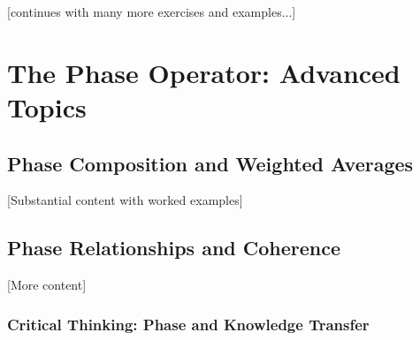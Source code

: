 [continues with many more exercises and examples...]

\chapter{The Phase Operator: Advanced Topics}

\section{Phase Composition and Weighted Averages}

[Substantial content with worked examples]

\section{Phase Relationships and Coherence}

[More content]

\subsection{Critical Thinking: Phase and Knowledge Transfer}

